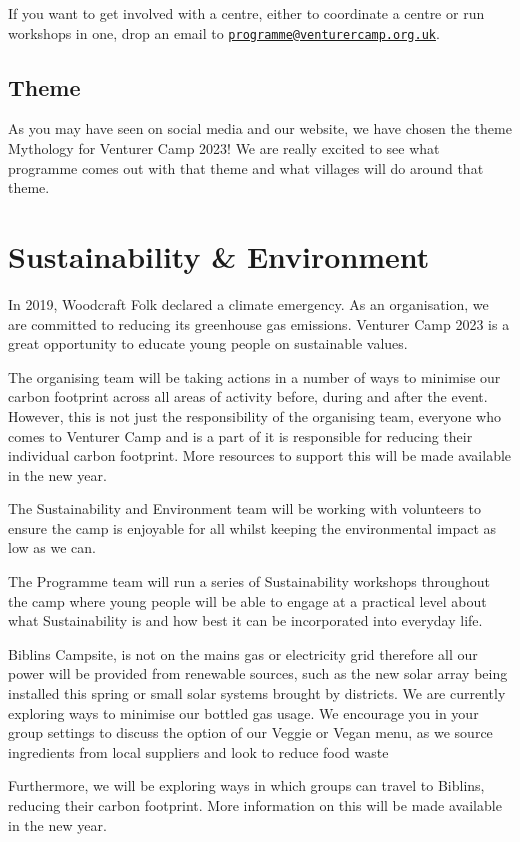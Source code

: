\documentclass[a4paper, 10pt]{report}
\begin{document}
If you want to get involved with a centre, either to coordinate a centre or run workshops in one, drop an email to \href{mailto:programme@venturercamp.org.uk}{\texttt{programme@venturercamp.org.uk}}.
\section{Theme}
As you may have seen on social media and our website, we have chosen the theme Mythology for Venturer Camp 2023! We are really excited to see what programme comes out with that theme and what villages will do around that theme.

\chapter{Sustainability \& Environment}
In 2019, Woodcraft Folk declared a climate emergency. As an organisation, we are committed to reducing its greenhouse gas emissions. Venturer Camp 2023 is a great opportunity to educate young people on sustainable values.

The organising team will be taking actions in a number of ways to minimise our carbon footprint across all areas of activity before, during and after the event. However, this is not just the responsibility of the organising team, everyone who comes to Venturer Camp and is a part of it is responsible for reducing their individual carbon footprint. More resources to support this will be made available in the new year.

The Sustainability and Environment team will be working with volunteers to ensure the camp is enjoyable for all whilst keeping the environmental impact as low as we can. 

The Programme team will run a series of Sustainability workshops throughout the camp where young people will be able to engage at a practical level about what Sustainability is and how best it can be incorporated into everyday life.

Biblins Campsite, is not on the mains gas or electricity grid therefore all our power will be provided from renewable sources, such as the new solar array being installed this spring or small solar systems brought by districts. We are currently exploring ways to minimise our bottled gas usage. We encourage you in your group settings to discuss the option of our Veggie or Vegan menu, as we source ingredients from local suppliers and look to reduce food waste 

Furthermore, we will be exploring ways in which groups can travel to Biblins, reducing their carbon footprint. More information on this will be made available in the new year.
\end{document}
